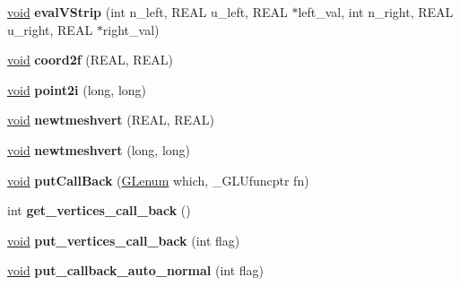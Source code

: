 \begin{DoxyCompactItemize}
\hyperlink{interfacevoid}{void} {\bfseries eval\+V\+Strip} (int n\+\_\+left, R\+E\+AL u\+\_\+left, R\+E\+AL $\ast$left\+\_\+val, int n\+\_\+right, R\+E\+AL u\+\_\+right, R\+E\+AL $\ast$right\+\_\+val)
\item 
\mbox{\label{class_open_g_l_surface_evaluator_a58df3f6dc46403e2fb3bfb6e9ecd4f81}} 
\hyperlink{interfacevoid}{void} {\bfseries coord2f} (R\+E\+AL, R\+E\+AL)
\item 
\mbox{\label{class_open_g_l_surface_evaluator_abddc1980789e0cad362e526a45da858c}} 
\hyperlink{interfacevoid}{void} {\bfseries point2i} (long, long)
\item 
\mbox{\label{class_open_g_l_surface_evaluator_a00d254df7ffcae278721c9d6ae95ac5e}} 
\hyperlink{interfacevoid}{void} {\bfseries newtmeshvert} (R\+E\+AL, R\+E\+AL)
\item 
\mbox{\label{class_open_g_l_surface_evaluator_ae4a72c7f4edb89c36775a86e5fd95cf5}} 
\hyperlink{interfacevoid}{void} {\bfseries newtmeshvert} (long, long)
\item 
\mbox{\label{class_open_g_l_surface_evaluator_a5819a93ee9036b4cbb3ea1bc0f17bef0}} 
\hyperlink{interfacevoid}{void} {\bfseries put\+Call\+Back} (\hyperlink{interfacevoid}{G\+Lenum} which, \+\_\+\+G\+L\+Ufuncptr fn)
\item 
\mbox{\label{class_open_g_l_surface_evaluator_aeb295097ed15037a0678b92f5c560883}} 
int {\bfseries get\+\_\+vertices\+\_\+call\+\_\+back} ()
\item 
\mbox{\label{class_open_g_l_surface_evaluator_ad037c053331f6876f428575b617e2d74}} 
\hyperlink{interfacevoid}{void} {\bfseries put\+\_\+vertices\+\_\+call\+\_\+back} (int flag)
\item 
\mbox{\label{class_open_g_l_surface_evaluator_a68e3f3b1b915836c97d897c528435f01}} 
\hyperlink{interfacevoid}{void} {\bfseries put\+\_\+callback\+\_\+auto\+\_\+normal} (int flag)
\item 
\mbox{\label{class_open_g_l_surface_evaluator_a742602c20e61c88b5a540dd1ca824211}} 

\end{DoxyCompactItemize}
